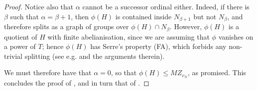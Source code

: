 \documentclass[svgnames]{amsart}
\theoremstyle{plain}
\theoremstyle{definition}
\begin{document}
\begin{proof}
    Notice also that $\alpha$ cannot be a successor ordinal either. Indeed, if there is $\beta$ such that $\alpha=\beta+1$, then $\phi(H)$ is contained inside $N_{\beta+1}$ but not $N_{\beta}$, and therefore splits as a graph of groups over $\phi(H)\cap N_{\beta}$. However, $\phi(H)$ is a quotient of $H$ with finite abelianisation, since we are assuming that $\phi$ vanishes on a power of $T$; hence $\phi(H)$ has Serre's property (FA), which forbids any non-trivial splitting (see e.g. \cite[page 6]{FA_MCG} and the arguments therein).

    We must therefore have that $\alpha=0$, so that $\phi(H)\le MZ_{v_N}$, as promised. This concludes the proof of , and in turn that of .
\end{proof}





\end{document}
